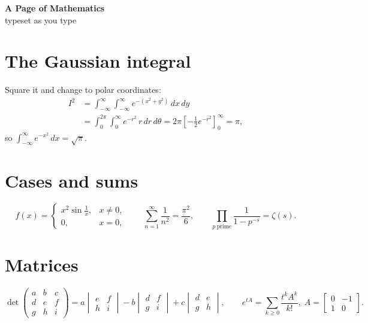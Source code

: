 \documentclass[11pt]{article}
\begin{document}
\begin{center}
  {\LARGE\bfseries A Page of Mathematics}\\[4pt]
  {\large typeset as you type}
\end{center}

\section*{The Gaussian integral}
Square it and change to polar coordinates:
\begin{align}
  I^2 &= \int_{-\infty}^{\infty}\!\int_{-\infty}^{\infty} e^{-(x^2+y^2)}\,dx\,dy \\
      &= \int_{0}^{2\pi}\!\int_{0}^{\infty} e^{-r^2}\, r\,dr\,d\theta
       = 2\pi \left[-\tfrac12 e^{-r^2}\right]_{0}^{\infty} = \pi,
\end{align}
so $\displaystyle \int_{-\infty}^{\infty} e^{-x^2}\,dx = \sqrt{\pi}$.

\section*{Cases and sums}
\begin{equation}
  f(x) =
  \begin{cases}
    x^2 \sin\frac{1}{x}, & x \neq 0,\\[2pt]
    0,                   & x = 0,
  \end{cases}
  \qquad
  \sum_{n=1}^{\infty} \frac{1}{n^2} = \frac{\pi^2}{6},
  \qquad
  \prod_{p\ \text{prime}} \frac{1}{1-p^{-s}} = \zeta(s).
\end{equation}

\section*{Matrices}
\begin{equation}
  \det\begin{pmatrix} a & b & c\\ d & e & f\\ g & h & i \end{pmatrix}
  = a\begin{vmatrix} e & f\\ h & i \end{vmatrix}
  - b\begin{vmatrix} d & f\\ g & i \end{vmatrix}
  + c\begin{vmatrix} d & e\\ g & h \end{vmatrix},
  \qquad
  e^{tA} = \sum_{k\ge 0} \frac{t^k A^k}{k!},\;
  A = \begin{bmatrix} 0 & -1\\ 1 & 0 \end{bmatrix}.
\end{equation}
\end{document}
